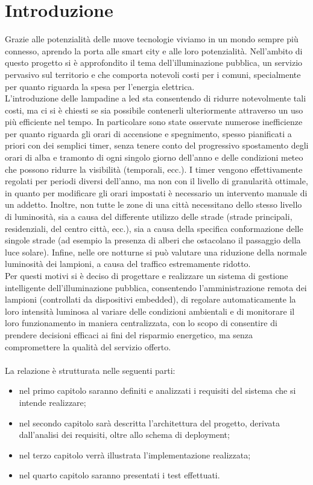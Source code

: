 \chapter{Introduzione}

Grazie alle potenzialità delle nuove tecnologie viviamo in un mondo sempre più connesso, aprendo la porta alle smart city e alle loro potenzialità.
Nell'ambito di questo progetto si è approfondito il tema dell'illuminazione pubblica, un servizio pervasivo sul territorio e che comporta notevoli costi per i comuni, specialmente per quanto riguarda la spesa per l'energia elettrica.
\\L'introduzione delle lampadine a led sta consentendo di ridurre notevolmente tali costi, ma ci si è chiesti se sia possibile contenerli ulteriormente attraverso un uso più efficiente nel tempo.
In particolare sono state osservate numerose inefficienze per quanto riguarda gli orari di accensione e spegnimento, spesso pianificati a priori con dei semplici timer, senza tenere conto del progressivo spostamento degli orari di alba e tramonto di ogni singolo giorno dell'anno e delle condizioni meteo che possono ridurre la visibilità (temporali, ecc.).
I timer vengono effettivamente regolati per periodi diversi dell'anno, ma non con il livello di granularità ottimale, in quanto per modificare gli orari impostati è necessario un intervento manuale di un addetto.
Inoltre, non tutte le zone di una città necessitano dello stesso livello di luminosità, sia a causa del differente utilizzo delle strade (strade principali, residenziali, del centro città, ecc.), sia a causa della specifica conformazione delle singole strade (ad esempio la presenza di alberi che ostacolano il passaggio della luce solare).
Infine, nelle ore notturne si può valutare una riduzione della normale luminosità dei lampioni, a causa del traffico estremamente ridotto.
\\Per questi motivi si è deciso di progettare e realizzare un sistema di gestione intelligente dell'illuminazione pubblica, consentendo l'amministrazione remota dei lampioni (controllati da dispositivi embedded), di regolare automaticamente la loro intensità luminosa al variare delle condizioni ambientali e di monitorare il loro funzionamento in maniera centralizzata, con lo scopo di consentire di prendere decisioni efficaci ai fini del risparmio energetico, ma senza compromettere la qualità del servizio offerto.
\\\\La relazione è strutturata nelle seguenti parti:
\begin{itemize}
 \item nel primo capitolo saranno definiti e analizzati i requisiti del sistema che si intende realizzare;
 \item nel secondo capitolo sarà descritta l'architettura del progetto, derivata dall'analisi dei requisiti, oltre allo schema di deployment;
 \item nel terzo capitolo verrà illustrata l'implementazione realizzata;
 \item nel quarto capitolo saranno presentati i test effettuati.
\end{itemize}
